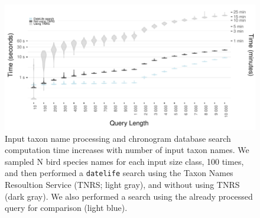 \newpage
\begin{figure}[!h]
\includegraphics{../figures/fig_runtime_main.pdf}
\caption{Input taxon name processing and chronogram database search computation time increases with number of input taxon names. We sampled N bird species names for each input size class, 100 times, and then performed a \texttt{datelife} search using the Taxon Names Resoultion Service (TNRS; light gray), and without using TNRS (dark gray). We also performed a search using the already processed query for comparison (light blue).}
\label{fig:benchmark}
\end{figure}
\newpage


